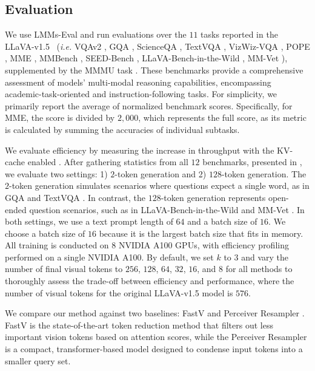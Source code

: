 \documentclass{article} %
\begin{document}
\subsection{Evaluation}
\label{subsec:eval}
We use LMMs-Eval \citep{lmms_eval2024} and run evaluations over the $11$ tasks reported in the LLaVA-v1.5~\citep{liu2024improved} (\textit{i.e.} VQAv2 \citep{goyal2017making}, GQA \citep{hudson2019gqa}, ScienceQA \citep{lu2022learn}, TextVQA \citep{singh2019towards}, VizWiz-VQA \citep{gurari2018vizwiz}, POPE \citep{li2023evaluating}, MME \citep{yin2023survey}, MMBench \citep{liu2023mmbench}, SEED-Bench \citep{li2023seed}, LLaVA-Bench-in-the-Wild \citep{liu2024visual}, MM-Vet \citep{yu2023mmvet}), supplemented by the MMMU task \citep{yue2024mmmu}. These benchmarks provide a comprehensive assessment of models' multi-modal reasoning capabilities, encompassing academic-task-oriented and instruction-following tasks. For simplicity, we primarily report the average of normalized benchmark scores. Specifically, for MME, the score is divided by $2,000$, which represents the full score, as its metric is calculated by summing the accuracies of individual subtasks.

We evaluate efficiency by measuring the increase in throughput with the KV-cache enabled \citep{pope2023efficiently}. After gathering statistics from all $12$ benchmarks, presented in , we evaluate two settings: 1) $2$-token generation and 2) $128$-token generation. The $2$-token generation simulates scenarios where questions expect a single word, as in GQA \citep{hudson2019gqa} and TextVQA \citep{singh2019towards}. In contrast, the $128$-token generation represents open-ended question scenarios, such as in LLaVA-Bench-in-the-Wild \citep{liu2024visual} and MM-Vet \citep{yu2023mmvet}. In both settings, we use a text prompt length of $64$ and a batch size of $16$. We choose a batch size of $16$ because it is the largest batch size that fits in memory. All training is conducted on $8$ NVIDIA A100 GPUs, with efficiency profiling performed on a single NVIDIA A100. By default, we set $k$ to $3$ and vary the number of final visual tokens to $256$, $128$, $64$, $32$, $16$, and $8$ for all methods to thoroughly assess the trade-off between efficiency and performance, where the number of visual tokens for the original LLaVA-v1.5 model is $576$.

We compare our method against two baselines: FastV \citep{chen2024image} and Perceiver Resampler \citep{jaegle2021perceiver}. FastV is the state-of-the-art token reduction method that filters out less important vision tokens based on attention scores, while the Perceiver Resampler is a compact, transformer-based model designed to condense input tokens into a smaller query set.
\end{document}
